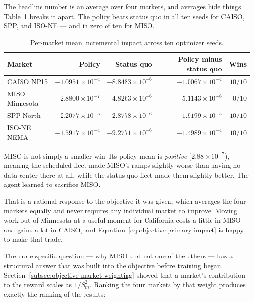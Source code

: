 ﻿\documentclass[12pt]{article}
\begin{document}
The headline number is an average over four markets, and averages hide things.
Table~\ref{tab:ten-seed-markets} breaks it apart. The policy beats status quo in
all ten seeds for CAISO, SPP, and ISO-NE --- and in zero of ten for MISO.

\begin{table}[htbp]
  \centering
  \small
  \caption{Per-market mean incremental impact across ten optimizer seeds.}
  \label{tab:ten-seed-markets}
  \begin{tabular}{@{}lrrrr@{}}
    \toprule
    Market & Policy & Status quo & Policy minus status quo & Wins \\
    \midrule
    CAISO NP15
      & \(-1.0951\times10^{-4}\) & \(-8.8483\times10^{-6}\)
      & \(-1.0067\times10^{-4}\) & \(10/10\) \\
    MISO Minnesota
      & \( 2.8800\times10^{-7}\) & \(-4.8263\times10^{-6}\)
      & \( 5.1143\times10^{-6}\) & \(0/10\) \\
    SPP North
      & \(-2.2077\times10^{-5}\) & \(-2.8778\times10^{-6}\)
      & \(-1.9199\times10^{-5}\) & \(10/10\) \\
    ISO-NE NEMA
      & \(-1.5917\times10^{-4}\) & \(-9.2771\times10^{-6}\)
      & \(-1.4989\times10^{-4}\) & \(10/10\) \\
    \bottomrule
  \end{tabular}
\end{table}

MISO is not simply a smaller win. Its policy mean is \emph{positive}
(\(2.88\times10^{-7}\)), meaning the scheduled fleet made MISO's ramps slightly
worse than having no data center there at all, while the status-quo fleet made
them slightly better. The agent learned to sacrifice MISO.

That is a rational response to the objective it was given, which averages the
four markets equally and never requires any individual market to improve.
Moving work out of Minnesota at a useful moment for California costs a little in
MISO and gains a lot in CAISO, and
Equation~\eqref{eq:objective-primary-impact} is happy to make that trade.

The more specific question --- why MISO and not one of the others --- has a
structural answer that was built into the objective before training began.
Section~\ref{subsec:objective-market-weighting} showed that a market's
contribution to the reward scales as \(1/S_m^{2}\). Ranking the four markets by
that weight produces exactly the ranking of the results:
\end{document}
